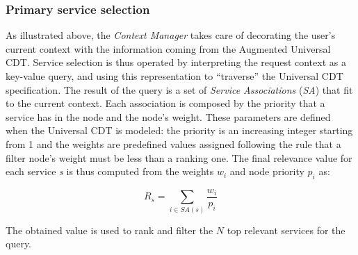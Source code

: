 \label{subsec:implementation}


\subsubsection{Primary service selection}
As illustrated above, the \emph{Context
Manager} takes care of  decorating the user's current context with
the information coming from the Augmented  Universal CDT. 
%
Service selection is thus operated by interpreting
the request context as a key-value query, and using this representation to ``traverse'' the Universal CDT specification. 
The result of the query is a set of \emph{Service Associations} (\emph{SA}) that fit to the current context. Each association is composed by the priority that a service has in the node and the node's weight. These parameters are defined when the Universal CDT is modeled: the priority is an increasing integer starting from 1 and the weights are predefined values assigned following the rule that a filter node's weight must be less than a ranking one.
The final relevance
value for each service \emph{s} is thus computed from the weights $w_i$
and node priority $p_i$ as:

\begin{equation}
R_s = \sum_{i \in SA(s)} \frac{w_i}{p_i}
  \label{eq:relevance}
\end{equation}


The obtained value is used to rank and filter the $N$ top relevant services
for the query.


